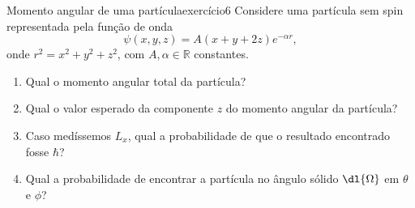\begin{exercício}{Momento angular de uma partícula}{exercício6}
    Considere uma partícula sem spin representada pela função de onda
    \begin{equation*}
        \psi(x,y,z) = A(x + y + 2z) e^{-\alpha r},
    \end{equation*}
    onde \(r^2 = x^2 + y^2 + z^2\), com \(A, \alpha \in \mathbb{R}\) constantes.
    \begin{enumerate}[label=(\alph*)]
        \item Qual o momento angular total da partícula?
        \item Qual o valor esperado da componente \(z\) do momento angular da partícula?
        \item Caso medíssemos \(L_x\), qual a probabilidade de que o resultado encontrado fosse \(\hbar\)?
        \item Qual a probabilidade de encontrar a partícula no ângulo sólido \(\dl{\Omega}\) em \(\theta\) e \(\phi\)?
    \end{enumerate}
\end{exercício}
